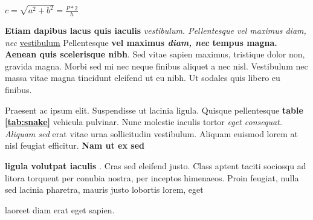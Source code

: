 $c=\sqrt{a^2+b^2}=\frac{P*2}{h}$
\vspace{10pt}

\textbf{Etiam dapibus lacus quis iaculis} \textit{vestibulum. Pellentesque vel maximus diam, nec } \underline{vestibulum} Pellentesque \textbf{vel maximus \emph{diam, nec} tempus magna. Aenean quis scelerisque nibh}. Sed vitae sapien maximus, tristique dolor non, gravida magna. Morbi sed mi nec neque finibus aliquet a nec nisl. Vestibulum nec massa vitae magna tincidunt eleifend ut eu nibh. Ut sodales quis libero eu finibus.

\begin{flushright} Praesent ac ipsum elit. Suspendisse ut lacinia ligula. Quisque pellentesque \textbf{table \ref{tab:snake}} vehicula pulvinar. Nunc molestie iaculis tortor \textit{eget consequat. Aliquam sed}  erat vitae urna sollicitudin vestibulum. Aliquam euismod lorem at nisl feugiat efficitur. \textbf{Nam ut ex sed}  \end{flushright} \begin{center} \textbf{ligula volutpat iaculis} . Cras sed eleifend justo. Class aptent taciti sociosqu ad litora torquent per conubia nostra, per inceptos himenaeos. Proin feugiat, nulla sed lacinia pharetra,  mauris justo lobortis lorem, eget \end{center} laoreet diam erat eget sapien.